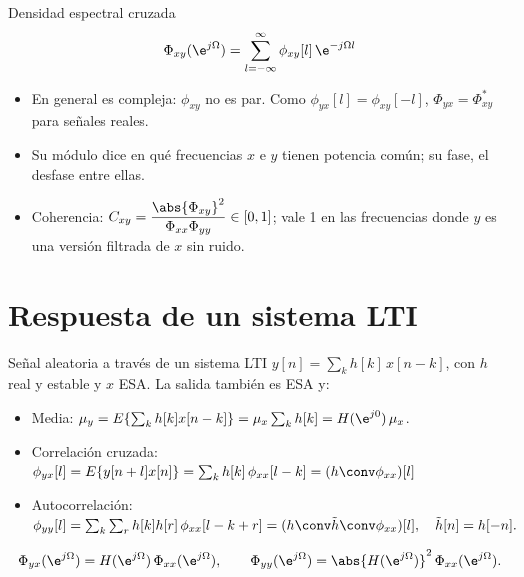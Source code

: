 \documentclass[aspectratio=169,11pt]{beamer}
\begin{document}
\begin{frame}{Densidad espectral cruzada}
  \small
  \[
    \Phi_{xy}(\e^{j\Omega})=\sum_{l=-\infty}^{\infty}\phi_{xy}[l]\,\e^{-j\Omega l}
  \]
  \begin{itemize}
    \item En general es \alert{compleja}: $\phi_{xy}$ no es par. Como $\phi_{yx}[l]=\phi_{xy}[-l]$, $\Phi_{yx}=\Phi_{xy}^*$ para señales reales.
    \item Su módulo dice en qué frecuencias $x$ e $y$ tienen potencia común; su fase, el desfase entre ellas.
    \item \alert{Coherencia}: $C_{xy}=\dfrac{\abs{\Phi_{xy}}^2}{\Phi_{xx}\Phi_{yy}}\in[0,1]$; vale 1 en las frecuencias donde $y$ es una versión filtrada de $x$ sin ruido.
  \end{itemize}
\end{frame}

\section{Respuesta de un sistema LTI}

\begin{frame}{Señal aleatoria a través de un sistema LTI}
  \small
  $y[n]=\sum_kh[k]\,x[n-k]$, con $h$ real y estable y $x$ ESA. La salida también es ESA y:
  \begin{itemize}
    \item \alert{Media}: $\mu_y=E\{\sum_kh[k]x[n-k]\}=\mu_x\sum_kh[k]=H(\e^{j0})\,\mu_x$.
    \item \alert{Correlación cruzada}:
    \(
      \phi_{yx}[l]=E\{y[n+l]x[n]\}=\sum_kh[k]\,\phi_{xx}[l-k]=(h\conv\phi_{xx})[l]
    \)
    \item \alert{Autocorrelación}:
    \(
      \phi_{yy}[l]=\sum_k\sum_rh[k]h[r]\,\phi_{xx}[l-k+r]=(h\conv\tilde h\conv\phi_{xx})[l],\quad\tilde h[n]=h[-n].
    \)
  \end{itemize}
  \begin{importante}[En frecuencia]
    \[
      \Phi_{yx}(\e^{j\Omega})=H(\e^{j\Omega})\,\Phi_{xx}(\e^{j\Omega}),\qquad
      \Phi_{yy}(\e^{j\Omega})=\abs{H(\e^{j\Omega})}^2\,\Phi_{xx}(\e^{j\Omega}).
    \]
  \end{importante}
\end{frame}
\end{document}
